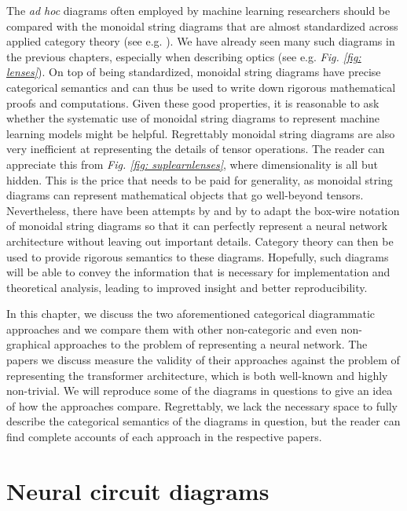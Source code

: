 \documentclass[11pt,a4paper,openright,twoside]{report}
\theoremstyle{plain}
\theoremstyle{definition}
\begin{document}
The \textit{ad hoc} diagrams often employed by machine learning researchers should be compared with the monoidal string diagrams that are almost standardized across applied category theory (see e.g. \cite{bonchi2022string}). We have already seen many such diagrams in the previous chapters, especially when describing optics (see e.g. \textit{Fig. \ref{fig: lenses}}). On top of being standardized, monoidal string diagrams have precise categorical semantics and can thus be used to write down rigorous mathematical proofs and computations. Given these good properties, it is reasonable to ask whether the systematic use of monoidal string diagrams to represent machine learning models might be helpful. Regrettably monoidal string diagrams are also very inefficient at representing the details of tensor operations. The reader can appreciate this from \textit{Fig. \ref{fig: suplearnlenses}}, where dimensionality is all but hidden. This is the price that needs to be paid for generality, as monoidal string diagrams can represent mathematical objects that go well-beyond tensors. Nevertheless, there have been attempts by \cite{abbott2023robust} and by \cite{khatri2024anatomy} to adapt the box-wire notation of monoidal string diagrams so that it can perfectly represent a neural network architecture without leaving out important details. Category theory can then be used to provide rigorous semantics to these diagrams. Hopefully, such diagrams will be able to convey the information that is necessary for implementation and theoretical analysis, leading to improved insight and better reproducibility.

In this chapter, we discuss the two aforementioned categorical diagrammatic approaches and we compare them with other non-categoric and even non-graphical approaches to the problem of representing a neural network. The papers we discuss measure the validity of their approaches against the problem of representing the transformer architecture, which is both well-known and highly non-trivial. We will reproduce some of the diagrams in questions to give an idea of how the approaches compare. Regrettably, we lack the necessary space to fully describe the categorical semantics of the diagrams in question, but the reader can find complete accounts of each approach in the respective papers.

\section{Neural circuit diagrams}
\end{document}
